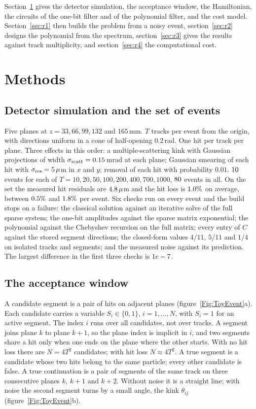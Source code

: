 \documentclass[11pt,a4paper]{article}
\newcommand{\gss}[1]{{\color{teal} #1}}
\begin{document}
\gss{Section~\ref{sec:methods} gives the detector simulation, the acceptance window, the Hamiltonian, the circuits of the one-bit filter and of the polynomial filter, and the cost model. Section~\ref{sec:r1} then builds the problem from a noisy event, section~\ref{sec:r2} designs the polynomial from the spectrum, section~\ref{sec:r3} gives the results against track multiplicity, and section~\ref{sec:r4} the computational cost.}

\section{Methods}\label{sec:methods}

\subsection{Detector simulation and the set of events}\label{sec:m:events}
Five planes at $z=33,66,99,132$ and $165$\,mm. $T$ tracks per event from the origin, with
directions uniform in a cone of half-opening $0.2$\,rad. One hit per track per plane. Three effects
in this order: a multiple-scattering kink with Gaussian projections of width $\sigma_{\rm scatt}=0.15$\,mrad
at each plane; Gaussian smearing of each hit with $\sigma_{\rm res}=5\,\mu$m in $x$ and $y$; removal of
each hit with probability $0.01$. $10$ events for each of $T=10,20,50,100,200,400,700,1000$,
$80$ events in all. On the set the measured hit residuals are $4.8\,\mu$m and the
hit loss is $1.0\%$ on average, between $0.5\%$ and $1.8\%$ per event.
Six checks run on every event and the build stops on a failure: the classical solution against an
iterative solve of the full sparse system; the one-bit amplitudes against the sparse matrix
exponential; the polynomial against the Chebyshev recursion on the full matrix; every entry of $C$
against the stored segment directions; the closed-form values $4/11$, $5/11$ and $1/4$ on isolated
tracks and segments; and the measured noise against its prediction. The largest difference in the
first three checks is $1e-7$.

\subsection{The acceptance window}\label{sec:m:window}
\gss{A candidate segment is a pair of hits on adjacent planes (figure~\ref{Fig:ToyEvent}a). Each candidate carries a variable $S_i\in\{0,1\}$, $i=1,\dots,N$, with $S_i=1$ for an active segment. The index $i$ runs over all candidates, not over tracks. A segment joins plane $k$ to plane $k+1$, so the plane index is implicit in $i$, and two segments share a hit only when one ends on the plane where the other starts. With no hit loss there are $N=4T^2$ candidates; with hit loss $N\approx4T^2$. A true segment is a candidate whose two hits belong to the same particle; every other candidate is false. A true continuation is a pair of segments of the same track on three consecutive planes $k$, $k+1$ and $k+2$. Without noise it is a straight line; with noise the second segment turns by a small angle, the kink $\theta_{ij}$ (figure~\ref{Fig:ToyEvent}b).}
\end{document}
